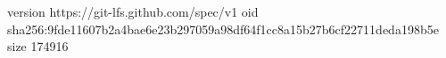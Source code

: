 version https://git-lfs.github.com/spec/v1
oid sha256:9fde11607b2a4bae6e23b297059a98df64f1cc8a15b27b6cf22711deda198b5e
size 174916
